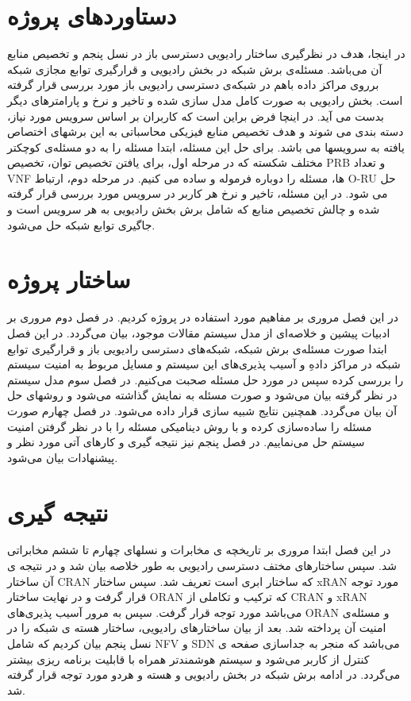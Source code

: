 \section{دستاوردهای پروژه}
در اینجا، هدف در نظرگیری ساختار رادیویی دسترسی باز در نسل پنجم و تخصیص منابع آن می‌باشد.
مسئله‌ی برش شبکه در بخش رادیویی و قرارگیری توابع مجازی شبکه برروی مراکز داده باهم در شبکه‌ی دسترسی رادیویی باز مورد بررسی قرار گرفته است. بخش رادیویی به صورت کامل مدل سازی شده و تاخیر و نرخ و پارامترهای دیگر بدست می آید. در اینچا فرض براین است که کاربران بر اساس سرویس مورد نیاز، دسته بندی می شوند و هدف تخصیص منابع فیزیکی محاسباتی به این برشهای اختصاص یافته به سرویسها می باشد.
برای حل این مسئله، ابتدا مسئله را به دو مسئله‌ی کوچکتر مختلف شکسته که در مرحله اول، برای یافتن تخصیص توان، تخصیص PRB و تعداد VNF ها، مسئله را دوباره فرموله و ساده می کنیم. در مرحله دوم، ارتباط O-RU حل می شود.
در این مسئله، تاخیر و نرخ هر کاربر در سرویس مورد بررسی قرار گرفته شده و چالش تخصیص منابع که شامل برش بخش رادیویی به هر سرویس است و جاگیری توابع شبکه حل می‌شود. 
\section{ساختار پروژه}
در این فصل مروری بر مفاهیم مورد استفاده در پروژه کردیم.
در فصل دوم مروری بر ادبیات پیشین و خلاصه‌ای از مدل سیستم مقالات موجود، بیان می‌گردد. در این فصل ابتدا صورت مسئله‌ی برش شبکه، شبکه‌های دسترسی رادیویی باز و قرارگیری توابع شبکه در مراکز دادهِ و آسیب پذیری‌های این سیستم و مسايل مربوط به امنیت سیستم را بررسی کرده سپس در مورد حل مسئله صحبت می‌کنیم.
در فصل سوم مدل سیستم در نظر گرفته بیان می‌شود و صورت مسئله به نمایش گذاشته می‌شود و روشهای حل آن بیان می‌گردد. همچنین  نتایج شبیه سازی قرار داده می‌شود.
در فصل چهارم صورت مسئله را ساده‌سازی کرده و با روش دینامیکی مسئله را با در نظر گرفتن امنیت سیستم حل می‌نماییم.
در فصل پنجم نیز نتیجه گیری و کارهای آتی مورد نظر و پیشنهادات بیان می‌شود.   
\section{نتیجه گیری}
در این فصل ابتدا مروری بر تاریخچه ی مخابرات و نسلهای چهارم تا ششم مخابراتی شد. سپس ساختارهای مختف دسترسی رادیویی به طور خلاصه بیان شد و در نتیجه ی آن ساختار CRAN که ساختار ابری است تعریف شد. سپس ساختار xRAN
مورد توجه قرار گرفت و در نهایت ساختار ORAN 
که ترکیب و تکاملی از CRAN و xRAN می‌باشد مورد توجه قرار گرفت.
سپس به مرور آسیب پذیری‌های ORAN و مسئله‌ی امنیت آن پرداخته شد.
بعد از بیان ساختارهای رادیویی، ساختار هسته ی شبکه را در نسل پنجم بیان کردیم که شامل 
NFV و SDN 
می‌باشد که منجر به جداسازی صفحه ی کنترل از کاربر می‌شود و سیستم هوشمندتر همراه با قابلیت برنامه ریزی بیشتر می‌گردد.
در ادامه برش شبکه در بخش رادیویی و هسته و هردو مورد توجه قرار گرفته شد.
